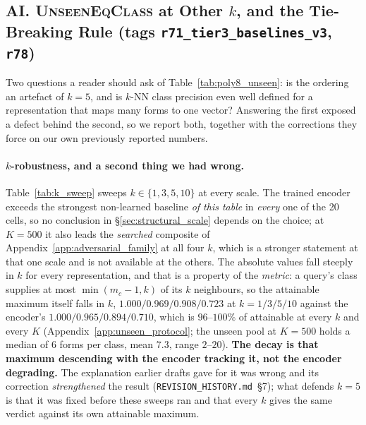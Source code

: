 \subsection*{AI. \textsc{UnseenEqClass} at Other $k$, and the Tie-Breaking Rule (tags \texttt{r71\_tier3\_baselines\_v3}, \texttt{r78})}

Two questions a reader should ask of Table~\ref{tab:poly8_unseen}: is the ordering an artefact of $k{=}5$, and is $k$-NN class precision even well defined for a representation that maps many forms to one vector? Answering the first exposed a defect behind the second, so we report both, together with the corrections they force on our own previously reported numbers.

\paragraph{$k$-robustness, and a second thing we had wrong.} Table~\ref{tab:k_sweep} sweeps $k \in \{1,3,5,10\}$ at every scale. The trained encoder exceeds the strongest non-learned baseline \emph{of this table} in \emph{every} one of the 20 cells, so no conclusion in \S\ref{sec:structural_scale} depends on the choice; at $K{=}500$ it also leads the \emph{searched} composite of Appendix~\ref{app:adversarial_family} at all four $k$, which is a stronger statement at that one scale and is not available at the others. The absolute values fall steeply in $k$ for every representation, and that is a property of the \emph{metric}: a query's class supplies at most $\min(m_c{-}1,k)$ of its $k$ neighbours, so the attainable maximum itself falls in $k$, $1.000/0.969/0.908/0.723$ at $k{=}1/3/5/10$ against the encoder's $1.000/0.965/0.894/0.710$, which is $96$--$100\%$ of attainable at every $k$ and every $K$ (Appendix~\ref{app:unseen_protocol}; the unseen pool at $K{=}500$ holds a median of $6$ forms per class, mean $7.3$, range $2$--$20$). \textbf{The decay is that maximum descending with the encoder tracking it, not the encoder degrading.} The explanation earlier drafts gave for it was wrong and its correction \emph{strengthened} the result (\texttt{REVISION\_HISTORY.md}~\S7); what defends $k{=}5$ is that it was fixed before these sweeps ran and that every $k$ gives the same verdict against its own attainable maximum.

